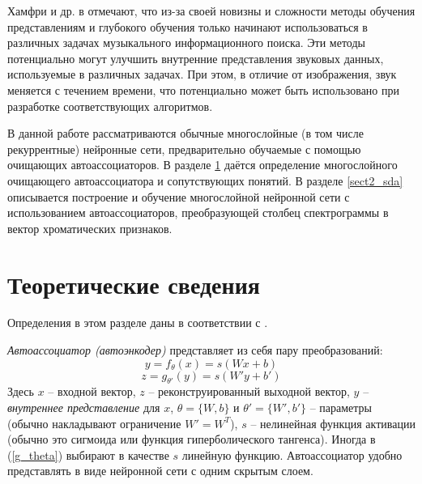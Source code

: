 Хамфри и др. в \cite{Humphrey2013} отмечают, что из-за своей новизны и сложности
методы обучения представлениям и глубокого обучения только начинают
использоваться в различных задачах музыкального информационного поиска. Эти
методы потенциально могут улучшить внутренние представления звуковых данных,
используемые в различных задачах. При этом, в отличие от изображения, звук
меняется с течением времени, что потенциально может быть использовано при
разработке соответствующих алгоритмов.

В данной работе рассматриваются обычные многослойные (в том числе рекуррентные)
нейронные сети, предварительно обучаемые с помощью очищающих автоассоциаторов. В
разделе \ref{sect2_theory} даётся определение многослойного очищающего
автоассоциатора и сопутствующих понятий. В разделе \ref{sect2_sda} описывается
построение и обучение многослойной нейронной сети с использованием
автоассоциаторов, преобразующей столбец спектрограммы в вектор хроматических
признаков.

\section{Теоретические сведения} \label{sect2_theory}

Определения в этом разделе даны в соответствии с \cite{Vincent2010}.

\emph{Автоассоциатор (автоэнкодер)} представляет из себя пару преобразований:
\begin{equation}
y = f_{\theta}(x) = s(Wx+b)
\end{equation}
\begin{equation} \label{g_theta}
z=g_{\theta'}(y) = s(W'y+b')
\end{equation}
Здесь $x$ -- входной вектор, $z$ -- реконструированный выходной вектор, $y$ --
\emph{внутреннее представление} для $x$, $\theta = \{W,b\}$ и
$\theta'=\{W',b'\}$ -- параметры (обычно накладывают ограничение $W'=W^T$), $s$
-- нелинейная функция активации (обычно это сигмоида или функция
гиперболического тангенса). Иногда в (\ref{g_theta}) выбирают в качестве $s$
линейную функцию. Автоассоциатор удобно представлять в виде нейронной сети с
одним скрытым слоем.

